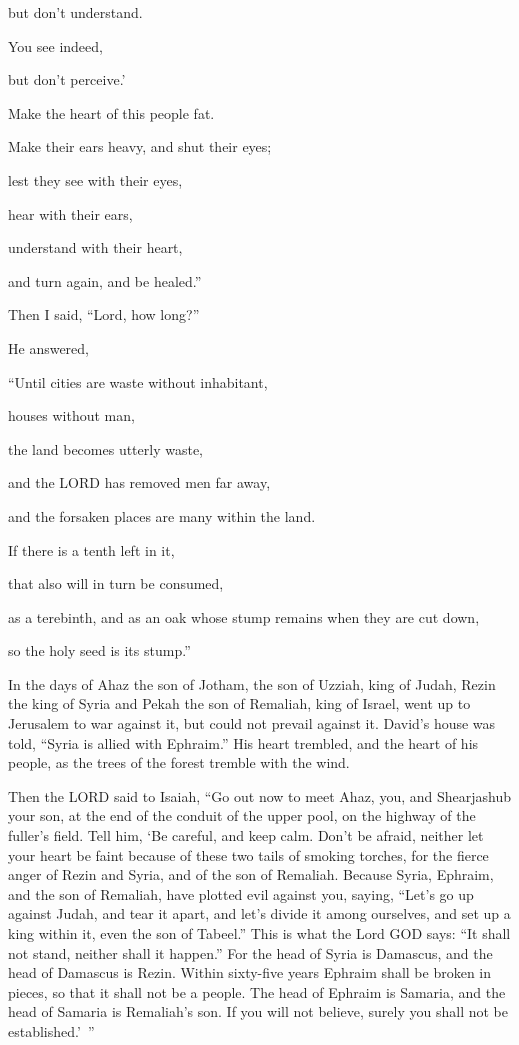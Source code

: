 but don’t understand.

You see indeed,

but don’t perceive.’

\myverse{}Make the heart of this people fat.

Make their ears heavy, and shut their eyes;

lest they see with their eyes,

hear with their ears,

understand with their heart,

and turn again, and be healed.”

\myverse{}Then I said, “Lord, how long?”

He answered,

“Until cities are waste without inhabitant,

houses without man,

the land becomes utterly waste,

\myverse{}and the LORD has removed men far away,

and the forsaken places are many within the land.

\myverse{}If there is a tenth left in it,

that also will in turn be consumed,

as a terebinth, and as an oak whose stump remains when they are cut down,

so the holy seed is its stump.”



\mychapter{} \myverse*{}In the days of Ahaz the son of Jotham, the son of Uzziah, king
of Judah, Rezin the king of Syria and Pekah the son of Remaliah, king of Israel, went up to Jerusalem
to war against it, but could not prevail against it.
\myverse{}David’s house was told, “Syria is allied with Ephraim.” His heart trembled,
and the heart of his people, as the trees of the forest tremble with the wind.

\myverse{}Then the LORD said to Isaiah, “Go out now to meet Ahaz, you, and
Shearjashub your son, at the end of the conduit of the upper pool, on the highway of the fuller’s field.
\myverse{}Tell him, ‘Be careful, and keep calm. Don’t be afraid, neither let your heart
be faint because of these two tails of smoking torches, for the fierce anger of Rezin and Syria, and of
the son of Remaliah.
\myverse{}Because Syria, Ephraim, and the son of Remaliah, have plotted evil against you,
saying,
\myverse{}“Let’s go up against Judah, and tear it apart, and let’s divide it among ourselves,
and set up a king within it, even the son of Tabeel.”
\myverse{}This is what the Lord GOD says: “It shall not stand, neither shall it happen.”
\myverse{}For the head of Syria is Damascus, and the head of Damascus is Rezin. Within
sixty-five years Ephraim shall be broken in pieces, so that it shall not be a people.
\myverse{}The head of Ephraim is Samaria, and the head of Samaria is Remaliah’s son. If
you will not believe, surely you shall not be established.’ ”

